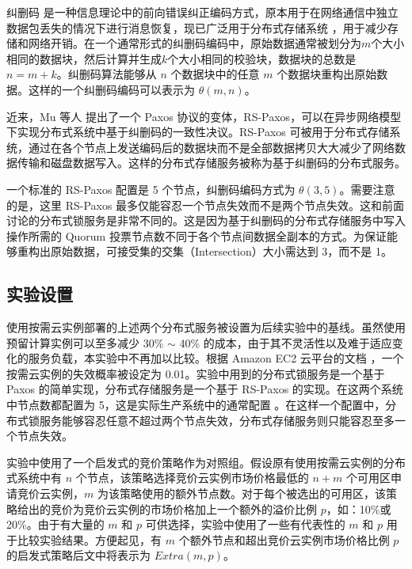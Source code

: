 纠删码 \cite{Rizzo:1997:EEC:263876.263881} 是一种信息理论中的前向错误纠正编码方式，原本用于在网络通信中独立数据包丢失的情况下进行消息恢复，现已广泛用于分布式存储系统 \cite{Huang:2012:ECW:2342821.2342823, Sathiamoorthy:2013:XEN:2488335.2488339}，用于减少存储和网络开销。在一个通常形式的纠删码编码中，原始数据通常被划分为$m$个大小相同的数据块，然后计算并生成$k$个大小相同的校验块，数据块的总数是 $n = m + k$。纠删码算法能够从 $n$ 个数据块中的任意 $m$ 个数据块重构出原始数据。这样的一个纠删码编码可以表示为 $\theta (m,n )$。

近来，Mu 等人 \cite{Mu:2014:PME:2600212.2600218} 提出了一个 Paxos 协议的变体，RS-Paxos，可以在异步网络模型下实现分布式系统中基于纠删码的一致性决议。RS-Paxos 可被用于分布式存储系统，通过在各个节点上发送编码后的数据块而不是全部数据拷贝大大减少了网络数据传输和磁盘数据写入。这样的分布式存储服务被称为基于纠删码的分布式服务。

一个标准的 RS-Paxos 配置是 5 个节点，纠删码编码方式为 $\theta(3, 5)$。需要注意的是，这里 RS-Paxos 最多仅能容忍一个节点失效而不是两个节点失效。这和前面讨论的分布式锁服务是非常不同的。这是因为基于纠删码的分布式存储服务中写入操作所需的 Quorum 投票节点数不同于各个节点间数据全副本的方式。为保证能够重构出原始数据，可接受集的交集（Intersection）大小需达到 3，而不是 1。

\subsection{实验设置}
使用按需云实例部署的上述两个分布式服务被设置为后续实验中的基线。虽然使用预留计算实例可以至多减少 30\% $\sim$ 40\% 的成本，由于其不灵活性以及难于适应变化的服务负载，本实验中不再加以比较。根据 Amazon EC2 云平台的文档 \cite{AWS_SLA:2014} ，一个按需云实例的失效概率被设定为 0.01。实验中用到的分布式锁服务是一个基于 Paxos 的简单实现，分布式存储服务是一个基于 RS-Paxos 的实现\cite{Mu:2014:PME:2600212.2600218}。在这两个系统中节点数都配置为 5，这是实际生产系统中的通常配置 \cite{Burrows:2006:CLS:1298455.1298487, Mu:2014:PME:2600212.2600218}。在这样一个配置中，分布式锁服务能够容忍任意不超过两个节点失效，分布式存储服务则只能容忍至多一个节点失效。

实验中使用了一个启发式的竞价策略作为对照组。假设原有使用按需云实例的分布式系统中有 $n$ 个节点，该策略选择竞价云实例市场价格最低的 $n + m$ 个可用区申请竞价云实例，$m$ 为该策略使用的额外节点数。对于每个被选出的可用区，该策略给出的竞价为竞价云实例的市场价格加上一个额外的溢价比例 $p$，如：10\%或20\%。由于有大量的 $m$ 和 $p$ 可供选择，实验中使用了一些有代表性的 $m$ 和 $p$ 用于比较实验结果。方便起见，有 $m$ 个额外节点和超出竞价云实例市场价格比例 $p$ 的启发式策略后文中将表示为 $Extra(m, p)$。

